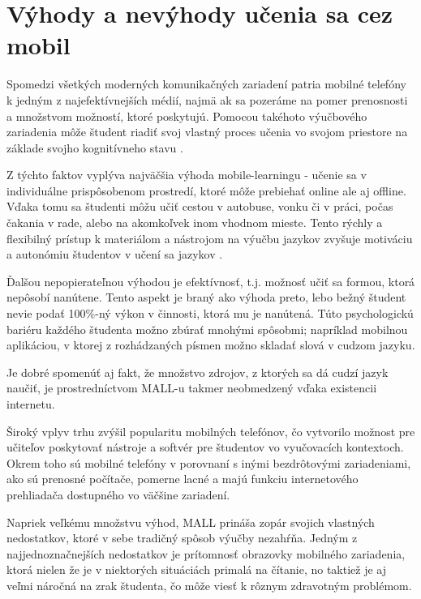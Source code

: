 \documentclass[10pt,oneside,slovak,a4paper]{article}
\begin{document}
\section{Výhody a nevýhody učenia sa cez mobil} \label{vyhodyanevyhody}

Spomedzi všetkých moderných komunikačných zariadení patria mobilné telefóny k jedným z najefektívnejších médií, najmä ak sa pozeráme na pomer prenosnosti a množstvom možností, ktoré poskytujú. Pomocou takéhoto výučbového zariadenia môže študent riadiť svoj vlastný proces učenia vo svojom priestore na základe svojho kognitívneho stavu \cite{Miangah2012}. 

Z týchto faktov vyplýva najväčšia výhoda mobile-learningu - učenie sa v individuálne prispôsobenom prostredí, ktoré môže prebiehať online ale aj offline. Vďaka tomu sa študenti môžu učiť cestou v autobuse, vonku či v práci, počas čakania v rade, alebo na akomkoľvek inom vhodnom mieste. Tento rýchly a flexibilný prístup k materiálom a nástrojom na výučbu jazykov zvyšuje motiváciu a autonómiu študentov v učení sa jazykov \cite{Kim2012}.

Ďalšou nepopierateľnou výhodou je efektívnosť, t.j. možnosť učiť sa formou, ktorá nepôsobí nanútene. Tento aspekt je braný ako výhoda preto, lebo bežný študent nevie podať 100\%-ný výkon v činnosti, ktorá mu je nanútená. Túto psychologickú bariéru každého študenta možno zbúrať mnohými spôsobmi; napríklad mobilnou aplikáciou, v ktorej z rozhádzaných písmen možno skladať slová v cudzom jazyku.

Je dobré spomenúť aj fakt, že množstvo zdrojov, z ktorých sa dá cudzí jazyk naučiť, je prostredníctvom MALL-u takmer neobmedzený vďaka existencii internetu.

Široký vplyv trhu zvýšil popularitu mobilných telefónov, čo vytvorilo možnost pre učiteľov poskytovať nástroje a softvér pre študentov vo vyučovacích kontextoch\cite{Miangah2012}. Okrem toho sú mobilné telefóny v porovnaní s inými bezdrôtovými zariadeniami, ako sú prenosné počítače, pomerne lacné a majú funkciu internetového prehliadača dostupného vo väčšine zariadení\cite{Miangah2012}.

Napriek veľkému množstvu výhod, MALL prináša zopár svojich vlastných nedostatkov, ktoré v sebe tradičný spôsob výučby nezahŕňa. Jedným z najjednoznačnejších nedostatkov je prítomnosť obrazovky mobilného zariadenia, ktorá nielen že je v niektorých situáciách primalá na čítanie, no taktiež je aj veľmi náročná na zrak študenta, čo môže viesť k rôznym zdravotným problémom.
\end{document}
